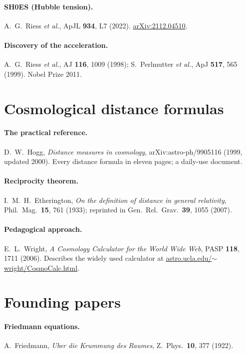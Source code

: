 \documentclass[11pt,a4paper,openany]{report}
\begin{document}
\paragraph{SH0ES (Hubble tension).}
A.~G.~Riess \emph{et al.}, ApJL \textbf{934}, L7 (2022).
\href{https://arxiv.org/abs/2112.04510}{arXiv:2112.04510}.

\paragraph{Discovery of the acceleration.}
A.~G.~Riess \emph{et al.}, AJ \textbf{116}, 1009 (1998);
S.~Perlmutter \emph{et al.}, ApJ \textbf{517}, 565 (1999). Nobel Prize 2011.

\section{Cosmological distance formulas}

\paragraph{The practical reference.}
D.~W.~Hogg, \emph{Distance measures in cosmology}, arXiv:astro-ph/9905116
(1999, updated 2000). Every distance formula in eleven pages; a daily-use
document.

\paragraph{Reciprocity theorem.}
I.~M.~H.~Etherington, \emph{On the definition of distance in general
relativity}, Phil.\ Mag.\ \textbf{15}, 761 (1933); reprinted in Gen.\ Rel.\
Grav.\ \textbf{39}, 1055 (2007).

\paragraph{Pedagogical approach.}
E.~L.~Wright, \emph{A Cosmology Calculator for the World Wide Web},
PASP \textbf{118}, 1711 (2006). Describes the widely used calculator at
\href{https://www.astro.ucla.edu/~wright/CosmoCalc.html}
     {astro.ucla.edu/$\sim$wright/CosmoCalc.html}.

\section{Founding papers}

\paragraph{Friedmann equations.}
A.~Friedmann, \emph{Uber die Krummung des Raumes}, Z.\ Phys.\ \textbf{10},
377 (1922).
\end{document}
